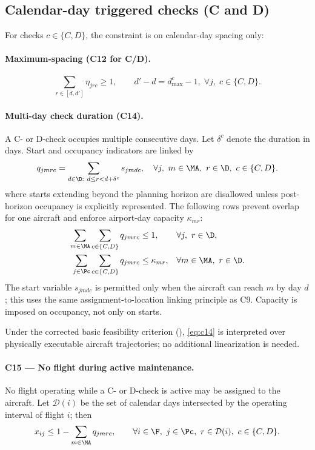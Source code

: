 \subsection{Calendar-day triggered checks (C and D)}

For checks $c \in \{C, D\}$, the constraint is on calendar-day spacing only:

\paragraph{Maximum-spacing (C12 for C/D).}
\begin{equation}\label{eq:c12_cd}
  \sum_{r \in [d,d']} \eta_{jrc} \ge 1,
  \qquad d'-d = d^c_{\max}-1,\; \forall j,\; c \in \{C,D\}.
\end{equation}

\paragraph{Multi-day check duration (C14).}
A C- or D-check occupies multiple consecutive days. Let $\delta^c$ denote
the duration in days. Start and occupancy indicators are linked by
\begin{equation}\label{eq:c14}
  q_{jmrc}=\sum_{d\in\D:\ d\le r<d+\delta^c}s_{jmdc},
  \quad \forall j,\ m\in\MA,\ r\in\D,\ c\in\{C,D\}.
\end{equation}
where starts extending beyond the planning horizon are disallowed unless
post-horizon occupancy is explicitly represented. The following rows prevent
overlap for one aircraft and enforce airport-day capacity $\kappa_{mr}$:
\begin{align}
  \sum_{m\in\MA}\sum_{c\in\{C,D\}}q_{jmrc}&\le1,
  &&\forall j,\ r\in\D,
  \label{eq:c14_no_overlap}\\
  \sum_{j\in\Pc}\sum_{c\in\{C,D\}}q_{jmrc}&\le\kappa_{mr},
  &&\forall m\in\MA,\ r\in\D.
  \label{eq:c14_capacity}
\end{align}
The start variable $s_{jmdc}$ is permitted only when the aircraft can reach
$m$ by day $d$; this uses the same assignment-to-location linking principle
as C9. Capacity is imposed on occupancy, not only on starts.

Under the corrected basic feasibility criterion
(), \eqref{eq:c14} is interpreted over physically
executable aircraft trajectories; no additional linearization is needed.

\paragraph{C15 — No flight during active maintenance.}
No flight operating while a C- or D-check is active may be assigned to the
aircraft. Let $\mathcal D(i)$ be the set of calendar days intersected by the
operating interval of flight $i$; then
\begin{equation}\label{eq:c15}
  x_{ij}\le 1-\sum_{m\in\MA}q_{jmrc},
  \qquad \forall i\in\F,\ j\in\Pc,\ r\in\mathcal D(i),\ c\in\{C,D\}.
\end{equation}

